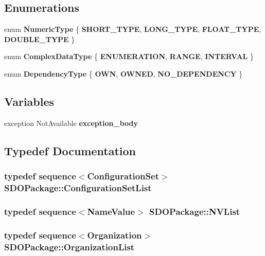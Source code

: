 \subsection*{Enumerations}
\begin{DoxyCompactItemize}
\item 
enum {\bf NumericType} \{ {\bf SHORT\_\-TYPE}, 
{\bf LONG\_\-TYPE}, 
{\bf FLOAT\_\-TYPE}, 
{\bf DOUBLE\_\-TYPE}
 \}
\item 
enum {\bf ComplexDataType} \{ {\bf ENUMERATION}, 
{\bf RANGE}, 
{\bf INTERVAL}
 \}
\item 
enum {\bf DependencyType} \{ {\bf OWN}, 
{\bf OWNED}, 
{\bf NO\_\-DEPENDENCY}
 \}
\end{DoxyCompactItemize}
\subsection*{Variables}
\begin{DoxyCompactItemize}
\item 
exception NotAvailable {\bf exception\_\-body}
\end{DoxyCompactItemize}


\subsection{Typedef Documentation}
\subsubsection[{ConfigurationSetList}]{\setlength{\rightskip}{0pt plus 5cm}typedef sequence$<${\bf ConfigurationSet}$>$ {\bf SDOPackage::ConfigurationSetList}}\label{namespaceSDOPackage_ad9d3f3e4436d5ae8aa92fd71fa85e034}
\subsubsection[{NVList}]{\setlength{\rightskip}{0pt plus 5cm}typedef sequence$<${\bf NameValue}$>$ {\bf SDOPackage::NVList}}\label{namespaceSDOPackage_a51e72be2b0d7e550db7782ddb1d58e9d}
\subsubsection[{OrganizationList}]{\setlength{\rightskip}{0pt plus 5cm}typedef sequence$<${\bf Organization}$>$ {\bf SDOPackage::OrganizationList}}\label{namespaceSDOPackage_a31cbea00ad118b641831e30a56e80a72}
